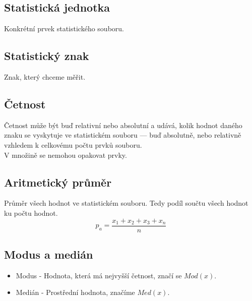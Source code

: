     \subsection{Statistická jednotka}
    Konkrétní prvek statistického souboru.
    \subsection{Statistický znak}
    Znak, který chceme měřit.
    \subsection{Četnost}
    Četnost může být buď relativní nebo absolutní a udává, kolik hodnot daného znaku se vyskytuje ve statistickém souboru — buď absolutně, nebo relativně vzhledem k celkovému počtu prvků souboru.\\
    V množině se nemohou opakovat prvky.
    \subsection{Aritmetický průměr}
    Průměr všech hodnot ve statistickém souboru. Tedy podíl součtu všech hodnot ku počtu hodnot.\\
    $$
    p_a=\frac{x_1+x_2+x_3+x_n}{n}
    $$
    \subsection{Modus a medián}
    \begin{itemize}
        \item Modus - Hodnota, která má nejvyšší četnost, značí se $Mod(x)$.
        \item Medián - Prostřední hodnota, značíme $Med(x)$.
    \end{itemize}
    